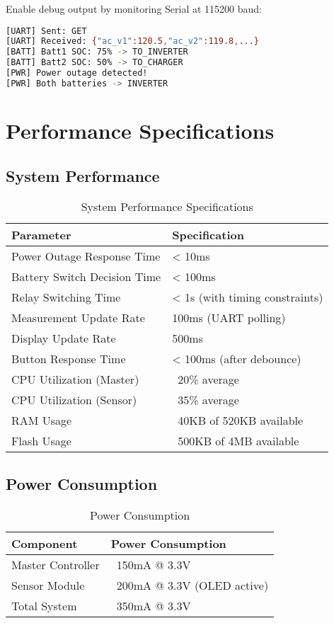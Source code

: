 \documentclass[11pt,a4paper]{article}
\begin{document}
Enable debug output by monitoring Serial at 115200 baud:

\begin{lstlisting}[language=bash]
[UART] Sent: GET
[UART] Received: {"ac_v1":120.5,"ac_v2":119.8,...}
[BATT] Batt1 SOC: 75% -> TO_INVERTER
[BATT] Batt2 SOC: 50% -> TO_CHARGER
[PWR] Power outage detected!
[PWR] Both batteries -> INVERTER
\end{lstlisting}

\section{Performance Specifications}

\subsection{System Performance}

\begin{table}[H]
\centering
\begin{tabular}{@{}ll@{}}
\toprule
Parameter & Specification \\ \midrule
Power Outage Response Time & < 10ms \\
Battery Switch Decision Time & < 100ms \\
Relay Switching Time & < 1s (with timing constraints) \\
Measurement Update Rate & 100ms (UART polling) \\
Display Update Rate & 500ms \\
Button Response Time & < 100ms (after debounce) \\
CPU Utilization (Master) & ~20\% average \\
CPU Utilization (Sensor) & ~35\% average \\
RAM Usage & ~40KB of 520KB available \\
Flash Usage & ~500KB of 4MB available \\ \bottomrule
\end{tabular}
\caption{System Performance Specifications}
\end{table}

\subsection{Power Consumption}

\begin{table}[H]
\centering
\begin{tabular}{@{}ll@{}}
\toprule
Component & Power Consumption \\ \midrule
Master Controller & ~150mA @ 3.3V \\
Sensor Module & ~200mA @ 3.3V (OLED active) \\
Total System & ~350mA @ 3.3V \\ \bottomrule
\end{tabular}
\caption{Power Consumption}
\end{table}
\end{document}
